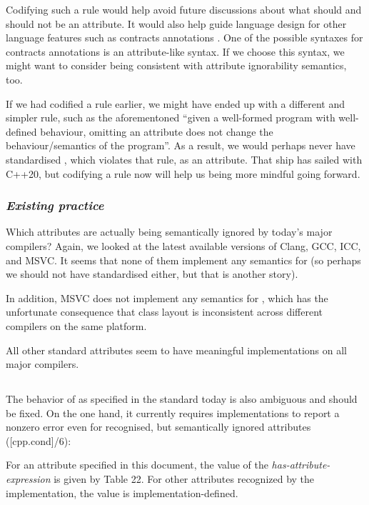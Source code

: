 Codifying such a rule would help avoid future discussions about what should and should not be an attribute. It would also help guide language design for other language features such as contracts annotations \cite{P2521R2}. One of the possible syntaxes for contracts annotations is an attribute-like syntax. If we choose this syntax, we might want to consider being consistent with attribute ignorability semantics, too.

If we had codified a rule earlier, we might have ended up with a different and simpler rule, such as the aforementoned ``given a well-formed program with well-defined behaviour, omitting an attribute does not change the behaviour/semantics of the program''. As a result, we would perhaps never have standardised \mbox{}, which violates that rule, as an attribute. That ship has sailed with C++20, but codifying a rule now will help us being more mindful going forward.

\subsubsection*{\emph{Existing practice}}

Which attributes are actually being semantically ignored by today's major compilers? Again, we looked at the latest available versions of Clang, GCC, ICC, and MSVC. It seems that none of them implement any semantics for  (so perhaps we should not have standardised  either, but that is another story).

In addition, MSVC does not implement any semantics for , which has the unfortunate consequence that class layout is inconsistent across different compilers on the same platform.

All other standard attributes seem to have meaningful implementations on all major compilers.

\subsection{}

The behavior of  as specified in the standard today is also ambiguous and should be fixed. On the one hand, it currently requires implementations to report a nonzero
error even for recognised, but semantically ignored attributes ([cpp.cond]/6):

\begin{adjustwidth}{0.5cm}{0.5cm}
For an attribute specified in this document, the value of the \emph{has-attribute-expression} is given by Table 22. For other attributes recognized by the implementation, the value is implementation-defined.
\end{adjustwidth}

